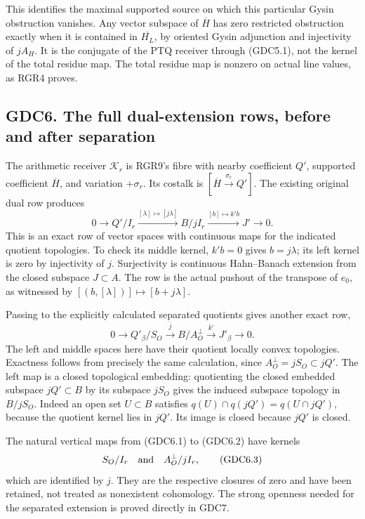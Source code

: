 This identifies the maximal supported source on which this particular
Gysin obstruction vanishes. Any vector subspace of \(\overline H\) has
zero restricted obstruction exactly when it is contained in
\(\overline{H_L}\), by oriented Gysin adjunction and injectivity of
\(jA_H\). It is the conjugate of the PTQ receiver through (GDC5.1), not
the kernel of the total residue map. The total residue map is nonzero on
actual line values, as RGR4 proves.

\subsection{GDC6. The full dual-extension rows, before and after
separation}\label{gdc6.-the-full-dual-extension-rows-before-and-after-separation}

The arithmetic receiver \(\mathscr K_r\) is RGR9's fibre with nearby
coefficient \(Q'\), supported coefficient \(\overline H\), and variation
\(+\sigma_r\). Its costalk is \([\overline H\xrightarrow{\sigma_r}Q']\).
The existing original dual row produces \[
0\to Q'/I_r\xrightarrow{[\lambda]\mapsto[j\lambda]}
B/jI_r\xrightarrow{[b]\mapsto k'b}J'\to0.
\tag{GDC6.1}
\] This is an exact row of vector spaces with continuous maps for the
indicated quotient topologies. To check its middle kernel, \(k'b=0\)
gives \(b=j\lambda\); its left kernel is zero by injectivity of \(j\).
Surjectivity is continuous Hahn--Banach extension from the closed
subspace \(J\subset A\). The row is the actual pushout of the transpose
of \(e_0\), as witnessed by \([(b,[\lambda])]\mapsto[b+j\lambda]\).

Passing to the explicitly calculated separated quotients gives another
exact row, \[
\boxed{0\to Q'_\beta/S_O\xrightarrow{\bar j}
B/A_O^\perp\xrightarrow{\bar k'}J'_\beta\to0.}
\tag{GDC6.2}
\] The left and middle spaces here have their quotient locally convex
topologies. Exactness follows from precisely the same calculation, since
\(A_O^\perp=jS_O\subset jQ'\). The left map is a closed topological
embedding: quotienting the closed embedded subspace \(jQ'\subset B\) by
its subspace \(jS_O\) gives the induced subspace topology in \(B/jS_O\).
Indeed an open set \(U\subset B\) satisfies
\(q(U)\cap q(jQ')=q(U\cap jQ')\), because the quotient kernel lies in
\(jQ'\). Its image is closed because \(jQ'\) is closed.

The natural vertical maps from (GDC6.1) to (GDC6.2) have kernels \[
S_O/I_r\quad\hbox{and}\quad A_O^\perp/jI_r,
\tag{GDC6.3}
\] which are identified by \(j\). They are the respective closures of
zero and have been retained, not treated as nonexistent cohomology. The
strong openness needed for the separated extension is proved directly in
GDC7.

